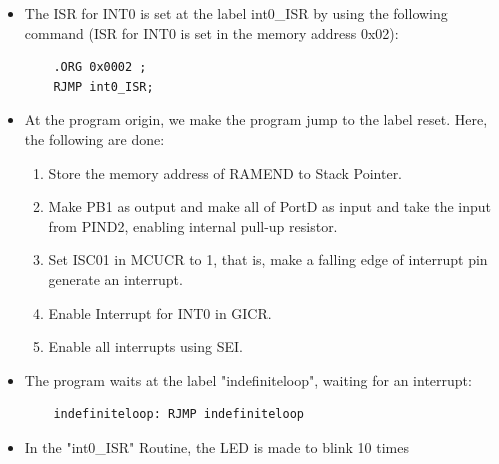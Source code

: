 \documentclass[titlepage, 11pt]{article}
\begin{document}
\begin{itemize}
\item The ISR for INT0 is set at the label int0\_ISR by using the following command (ISR for INT0 is set in the memory address 0x02):
{\renewcommand\fcolorbox[4][]{\textcolor{black}{\strut#4}}
\begin{verbatim}
    .ORG 0x0002 ;
    RJMP int0_ISR;
\end{verbatim}
}

\item At the program origin, we make the program jump to the label reset. Here, the following are done:

    \begin{enumerate}
        \item Store the memory address of RAMEND to Stack Pointer.
        \item Make PB1 as output and make all of PortD as input and take the input from PIND2, enabling internal pull-up resistor.
        \item Set ISC01 in MCUCR to 1, that is, make a falling edge of interrupt pin generate an interrupt.
        \item Enable Interrupt for INT0 in GICR.
        \item Enable all interrupts using SEI.
    \end{enumerate}

\item The program waits at the label "indefiniteloop", waiting for an interrupt:
    {\renewcommand\fcolorbox[4][]{\textcolor{black}{\strut#4}}
    \begin{verbatim}
    indefiniteloop: RJMP indefiniteloop
    \end{verbatim}
}

\item In the "int0\_ISR" Routine, the LED is made to blink 10 times
\end{itemize}
\end{document}

